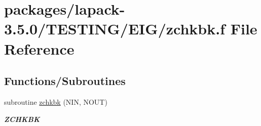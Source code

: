 \hypertarget{zchkbk_8f}{}\section{packages/lapack-\/3.5.0/\+T\+E\+S\+T\+I\+N\+G/\+E\+I\+G/zchkbk.f File Reference}
\label{zchkbk_8f}
\subsection*{Functions/\+Subroutines}
\begin{DoxyCompactItemize}
\item 
subroutine \hyperlink{group__complex16__eig_ga2497b5e3c907b7b142fdc6a9f1fb6e84}{zchkbk} (N\+I\+N, N\+O\+U\+T)
\begin{DoxyCompactList}\small\item\em {\bfseries Z\+C\+H\+K\+B\+K} \end{DoxyCompactList}\end{DoxyCompactItemize}
